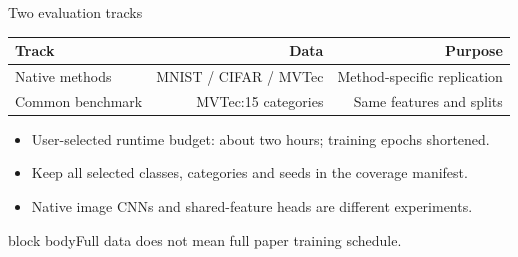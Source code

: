 \documentclass[aspectratio=169,professionalfonts,10pt]{beamer}
\newcommand{\band}[1]{\begin{beamercolorbox}[rounded=true,sep=0.17cm]{block body}#1\end{beamercolorbox}}
\begin{document}
\begin{frame}[t]{Two evaluation tracks}
\small
\begin{center}
\renewcommand{\arraystretch}{1.16}
\begin{tabular}{lrr}
\toprule
\textbf{Track} & \textbf{Data} & \textbf{Purpose} \\
\midrule
Native methods & MNIST / CIFAR / MVTec & Method-specific replication \\
Common benchmark & MVTec:15 categories & Same features and splits \\
\bottomrule
\end{tabular}
\end{center}

\begin{itemize}
\item User-selected runtime budget: about two hours; training epochs shortened.
\item Keep all selected classes, categories and seeds in the coverage manifest.
\item Native image CNNs and shared-feature heads are different experiments.
\end{itemize}

\vfill
\band{\small Full data does not mean full paper training schedule.}

\end{frame}
\end{document}
